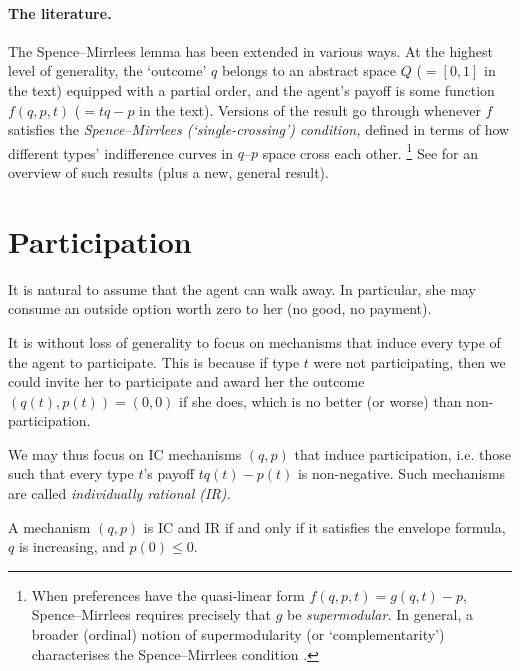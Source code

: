 \paragraph{The literature.}
The Spence--Mirrlees lemma has been extended in various ways.
At the highest level of generality, the `outcome' $q$ belongs to an abstract space $Q$ ($=[0,1]$ in the text) equipped with a partial order,
and the agent's payoff is some function $f(q,p,t)$ ($=tq-p$ in the text).
Versions of the result go through whenever $f$ satisfies the \emph{Spence--Mirrlees (`single-crossing') condition,}
defined in terms of how different types' indifference curves in $q$--$p$ space cross each other.%
	\footnote{When preferences have the quasi-linear form $f(q,p,t) = g(q,t) - p$, Spence--Mirrlees requires precisely that $g$ be \emph{supermodular.}
	In general, a broader (ordinal) notion of supermodularity (or `complementarity') characterises the Spence--Mirrlees condition \parencite[][Theorem 3]{MilgromShannon1994}.}
See \textcite[§4]{Sinander2022} for an overview of such results (plus a new, general result).



\section{Participation}
\label{sec:ch1:part}

It is natural to assume that the agent can walk away.
In particular, she may consume an outside option worth zero to her (no good, no payment).

It is without loss of generality to focus on mechanisms that induce every type of the agent to participate.
This is because if type $t$ were not participating, then we could invite her to participate and award her the outcome $(q(t),p(t)) = (0,0)$ if she does, which is no better (or worse) than non-participation.

We may thus focus on IC mechanisms $(q,p)$ that induce participation, i.e. those such that every type $t$'s payoff $t q(t) - p(t)$ is non-negative. Such mechanisms are called \emph{individually rational (IR).}

\begin{corollary}
	\label{corollary:ic_ir}
	A mechanism $(q,p)$ is IC and IR if and only if
	it satisfies the envelope formula,
	$q$ is increasing,
	and $p(0) \leq 0$.
\end{corollary}

